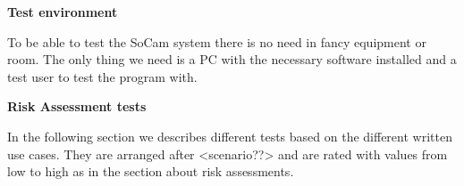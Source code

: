 	{\bf Test environment}

	To be able to test the SoCam system there is no need in fancy equipment or room. The only thing we need 
	is a PC with the necessary software installed and a test user to test the program with.

	{\bf Risk Assessment tests}

	In the following section we describes different tests based on the different written use cases. 
	They are arranged after <scenario??> and are rated with values from low to high as in the section 
	about risk assessments. 


